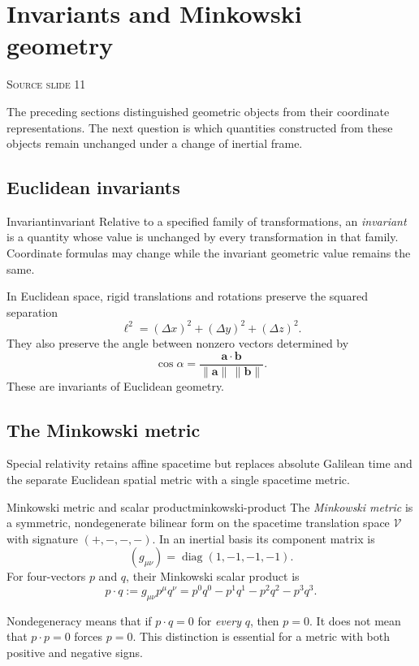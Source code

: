 \documentclass[11pt,a4paper]{article}
\newcommand{\vect}[1]{\bm{#1}}
\newcommand{\slideref}[1]{%
  \par\smallskip
  {\footnotesize\color{ink!60}\textsc{Source slide #1}}\par
}
\begin{document}
\section{Invariants and Minkowski geometry}
\slideref{11}

The preceding sections distinguished geometric objects from their coordinate
representations. The next question is which quantities constructed from these objects
remain unchanged under a change of inertial frame.

\subsection{Euclidean invariants}

\begin{definition}{Invariant}{invariant}
Relative to a specified family of transformations, an \emph{invariant} is a
quantity whose value is unchanged by every transformation in that family.
Coordinate formulas may change while the invariant geometric value remains
the same.
\end{definition}

In Euclidean space, rigid translations and rotations preserve the squared
separation
\[
  \ell^2
  =(\Delta x)^2+(\Delta y)^2+(\Delta z)^2.
\]
They also preserve the angle between nonzero vectors determined by
\[
  \cos\alpha
  =\frac{\vect{a}\cdot\vect{b}}
  {\lVert\vect{a}\rVert\,\lVert\vect{b}\rVert}.
\]
These are invariants of Euclidean geometry.

\subsection{The Minkowski metric}

Special relativity retains affine spacetime but replaces absolute Galilean
time and the separate Euclidean spatial metric with a single spacetime metric.

\begin{definition}{Minkowski metric and scalar product}{minkowski-product}
The \emph{Minkowski metric} is a symmetric, nondegenerate bilinear form on the
spacetime translation space \(\mathcal V\) with signature \((+,-,-,-)\). In an
inertial basis its component matrix is
\[
  (g_{\mu\nu})=\operatorname{diag}(1,-1,-1,-1).
\]
For four-vectors \(p\) and \(q\), their Minkowski scalar product is
\[
  p\cdot q
  :=g_{\mu\nu}p^\mu q^\nu
  =p^0q^0-p^1q^1-p^2q^2-p^3q^3.
\]
\end{definition}

Nondegeneracy means that if \(p\cdot q=0\) for \emph{every} \(q\), then
\(p=0\). It does not mean that \(p\cdot p=0\) forces \(p=0\). This distinction
is essential for a metric with both positive and negative signs.
\end{document}
